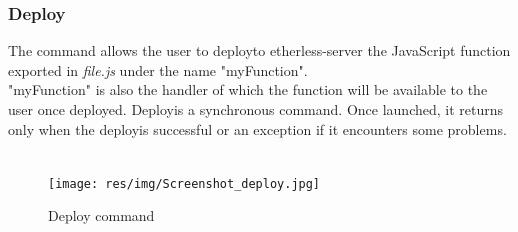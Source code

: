 \subsubsection{Deploy\glo}
The command allows the user to deploy\glo to etherless-server the JavaScript function exported in \textit{file.js} under the name "myFunction".\\ 
"myFunction" is also the handler of which the function will be available to the user once deployed. Deploy\glo is a synchronous command. Once launched, it returns only when the deploy\glo is successful or an exception if it encounters some problems.\\
\\
\centerline{}
\begin{figure}
	\centering
	\texttt{[image: res/img/Screenshot\_deploy.jpg]}
	\caption{Deploy command}
\end{figure}
\\




